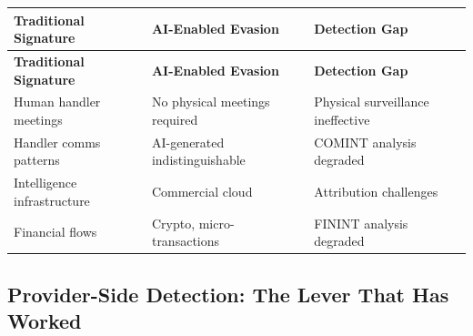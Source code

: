 \documentclass[11pt,letterpaper]{article}
\begin{document}
{\small
\begin{longtable}{L{3.5cm}L{4cm}L{4.5cm}}
\toprule
\textbf{Traditional Signature} & \textbf{AI-Enabled Evasion} & \textbf{Detection Gap} \\
\midrule
\endfirsthead
\toprule
\textbf{Traditional Signature} & \textbf{AI-Enabled Evasion} & \textbf{Detection Gap} \\
\midrule
\endhead
Human handler meetings & No physical meetings required & Physical surveillance ineffective \\*
Handler comms patterns & AI-generated indistinguishable & COMINT analysis degraded \\
Intelligence infrastructure & Commercial cloud & Attribution challenges \\*
Financial flows & Crypto, micro-transactions & FININT analysis degraded \\
\bottomrule
\end{longtable}}

\subsection{Provider-Side Detection: The Lever That Has Worked}
\end{document}
